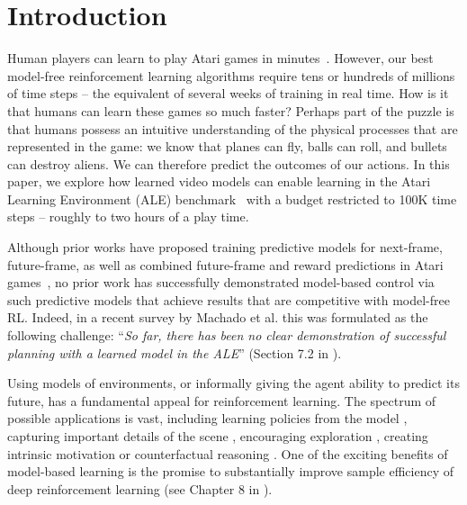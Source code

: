 \section{Introduction}

Human players can learn to play Atari games in minutes~\citep{human_atari_minutes}. However, our best model-free reinforcement learning algorithms require tens or hundreds of millions of time steps -- the equivalent of several weeks of training in real time. How is it that humans can learn these games so much faster? Perhaps part of the puzzle is that humans possess an intuitive understanding of the physical processes that are represented in the game: we know that planes can fly, balls can roll, and bullets can destroy aliens. We can therefore predict the outcomes of our actions. In this paper, we explore how learned video models can enable learning in the Atari Learning Environment (ALE) benchmark~\cite{ale, ale2} with a budget restricted to 100K time steps -- roughly to two hours of a play time.

Although prior works have proposed training predictive models for next-frame, future-frame, as well as combined future-frame and reward predictions in Atari games~\cite{video_prediction,recurrent, video_reward_prediction}, no prior work has successfully demonstrated model-based control via such predictive models that achieve results that are competitive with model-free RL. Indeed, in a recent survey by Machado et al. this was formulated as the following challenge: ``\emph{So far, there has been no clear demonstration of successful planning with a learned model in the ALE}'' (Section 7.2 in \citet{ale2}).


Using models of environments, or informally giving the agent ability to predict its future, has a fundamental appeal for reinforcement learning. The spectrum of possible applications is vast, including learning policies
from the model \citep[Chapter~8]{embed_to_control, deep_spatial, finn2016, ebert, hafner, piergiovanni, rybkin-pertsch,sutton_barto_2017}, capturing important details of the scene \cite{world_models}, encouraging exploration \cite{video_prediction},  creating intrinsic motivation \cite{schmidhuber_formal_theory} or counterfactual reasoning \cite{woulda_coulda_shoulda}.
One of the exciting benefits of model-based learning is the promise to substantially improve sample efficiency of deep reinforcement learning (see Chapter 8 in \cite{sutton_barto_2017}).

